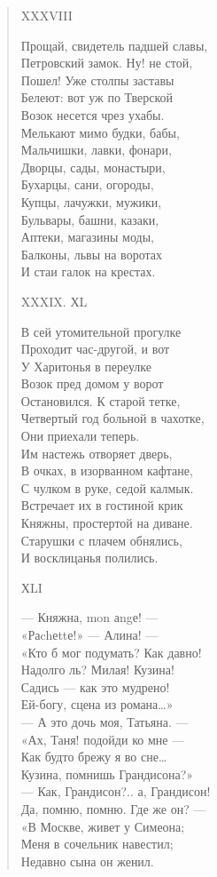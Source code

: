 \begin{verse}
XXXVIII

Прощай, свидетель падшей славы,\\
Петровский замок. Ну! не стой,\\
Пошел! Уже столпы заставы\\
Белеют: вот уж по Тверской\\
Возок несется чрез ухабы.\\
Мелькают мимо будки, бабы,\\
Мальчишки, лавки, фонари,\\
Дворцы, сады, монастыри,\\
Бухарцы, сани, огороды,\\
Купцы, лачужки, мужики,\\
Бульвары, башни, казаки,\\
Аптеки, магазины моды,\\
Балконы, львы на воротах\\
И стаи галок на крестах.

XXXIX. ХL

В сей утомительной прогулке\\
Проходит час-другой, и вот\\
У Харитонья в переулке\\
Возок пред домом у ворот\\
Остановился. К старой тетке,\\
Четвертый год больной в чахотке,\\
Они приехали теперь.\\
Им настежь отворяет дверь,\\
В очках, в изорванном кафтане,\\
С чулком в руке, седой калмык.\\
Встречает их в гостиной крик\\
Княжны, простертой на диване.\\
Старушки с плачем обнялись,\\
И восклицанья полились.

ХLI

— Княжна, mon аngе! —\\
«Раchеttе!» — Алина! —\\
«Кто б мог подумать? Как давно!\\
Надолго ль? Милая! Кузина!\\
Садись — как это мудрено!\\
Ей-богу, сцена из романа…»\\
— А это дочь моя, Татьяна. —\\
«Ах, Таня! подойди ко мне —\\
Как будто брежу я во сне…\\
Кузина, помнишь Грандисона?»\\
— Как, Грандисон?.. а, Грандисон!\\
Да, помню, помню. Где же он? —\\
«В Москве, живет у Симеона;\\
Меня в сочельник навестил;\\
Недавно сына он женил.


\end{verse}
